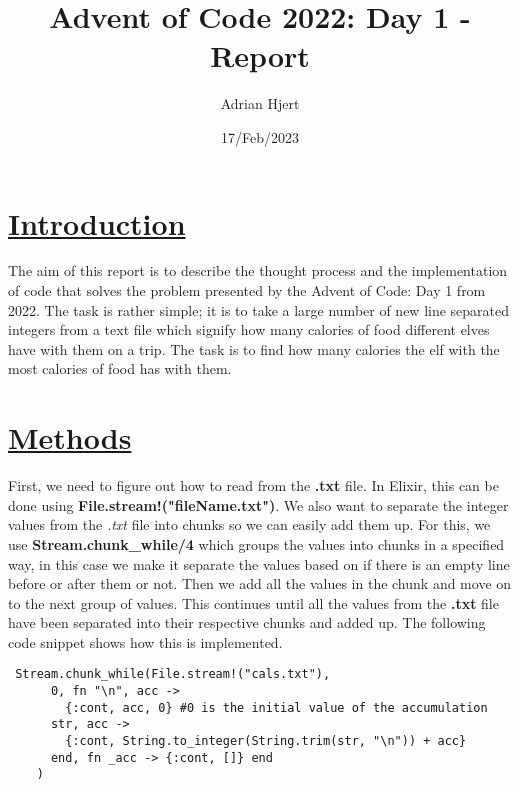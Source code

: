 \documentclass[a4paper,11pt]{article}
\begin{document}
\title{
	\textbf{Advent of Code 2022: Day 1 - Report}
	}
\author{Adrian Hjert}
\date{17/Feb/2023}

\maketitle

\section*{
	\underline{Introduction}
	}
The aim of this report is to describe the thought process and the implementation of code that solves the problem presented by the Advent of Code: Day 1 from 2022. The task is rather simple; it is to take a large number of new line separated integers from a text file which signify how many calories of food different elves have with them on a trip. The task is to find how many calories the elf with the most calories of food has with them.



\section*{
	\underline{Methods}
	}
First, we need to figure out how to read from the \textbf{.txt} file. In Elixir, this can be done using \textbf{File.stream!("fileName.txt")}. We also want to separate the integer values from the \textit{.txt} file into chunks so we can easily add them up. For this, we use \textbf{Stream.chunk\_while/4} which groups the values into chunks in a specified way, in this case we make it separate the values based on if there is an empty line before or after them or not. Then we add all the values in the chunk and move on to the next group of values. This continues until all the values from the \textbf{.txt} file have been separated into their respective chunks and added up. The following code snippet shows how this is implemented.

\begin{verbatim}
 Stream.chunk_while(File.stream!("cals.txt"),
      0, fn "\n", acc ->
        {:cont, acc, 0} #0 is the initial value of the accumulation
      str, acc ->
        {:cont, String.to_integer(String.trim(str, "\n")) + acc}
      end, fn _acc -> {:cont, []} end
    )
\end{verbatim}
\end{document}
